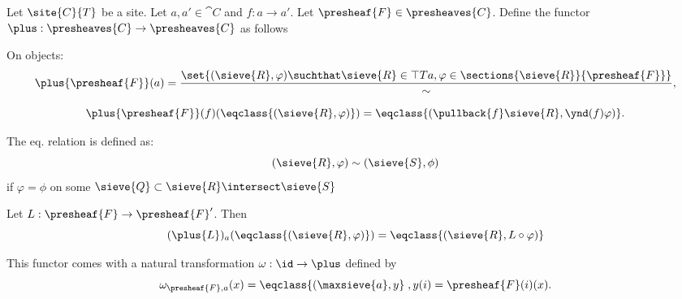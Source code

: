 \begin{definition}
Let $\site{C}{T}$ be a site.
Let $a, a' \in \cat{C}$ and $f:a \rightarrow a'$. 
Let $\presheaf{F} \in \presheaves{C}$.
Define the functor $\plus: \presheaves{C} \rightarrow \presheaves{C}$ as follows

On objects:
\[\plus{\presheaf{F}}(a) = \frac{\set{(\sieve{R},\varphi) 
	\suchthat \sieve{R} \in \top{T}{a},
	\varphi \in \sections{\sieve{R}}{\presheaf{F}}}}
	{\sim},
\]


\[ \plus{\presheaf{F}}(f)(\eqclass{(\sieve{R},\varphi)}) 
	= \eqclass{(\pullback{f}\sieve{R}, \ynd(f)\varphi )}.
\]

The eq. relation is defined as:
\[(\sieve{R},\varphi) \sim (\sieve{S},\phi)\]
if $\varphi = \phi$ on some $\sieve{Q} \subset \sieve{R} \intersect \sieve{S}$

Let $L: \presheaf{F} \rightarrow \presheaf{F}'$.
Then 
\[ (\plus{L})_a (\eqclass{(\sieve{R}, \varphi)})
	= \eqclass{(\sieve{R}, L \circ \varphi)}
\]

This functor comes with a natural transformation $\omega: \id \rightarrow \plus$
defined by
\[\omega_{\presheaf{F},a}(x) = \eqclass{(\maxsieve{a}, y}\;, y(i) = \presheaf{F}(i)(x).\]
\end{definition}






